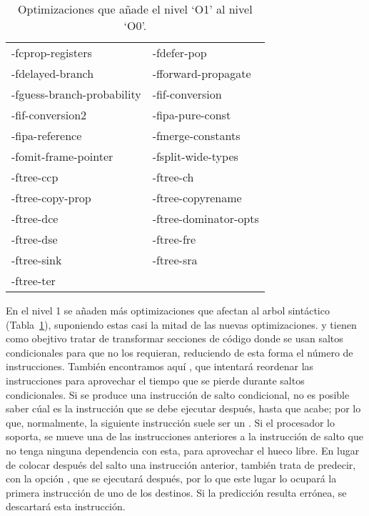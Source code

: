 \begin{table}[htb]
\begin{center}
	\begin{tabular}{|ll|}
		\hline
		-fcprop-registers & -fdefer-pop\\
		-fdelayed-branch & -fforward-propagate\\
		-fguess-branch-probability &-fif-conversion\\
		-fif-conversion2 & -fipa-pure-const\\
		-fipa-reference & -fmerge-constants\\
		-fomit-frame-pointer & -fsplit-wide-types\\
		-ftree-ccp & -ftree-ch\\
		-ftree-copy-prop & -ftree-copyrename\\
		-ftree-dce & -ftree-dominator-opts\\
		-ftree-dse & -ftree-fre\\
		-ftree-sink & -ftree-sra\\
		-ftree-ter & \\
		\hline
	\end{tabular}
\end{center}
\caption{Optimizaciones que añade el nivel `O1' al nivel `O0'.}
\label{opt1}
\end{table}

En el nivel 1 se añaden más optimizaciones que afectan al arbol sintáctico (Tabla~\ref{opt1}), suponiendo estas casi la mitad de las nuevas optimizaciones.  y  tienen como obejtivo tratar de transformar secciones de código donde se usan saltos condicionales para que no los requieran, reduciendo de esta forma el número de instrucciones. También encontramos aquí , que intentará reordenar las instrucciones para aprovechar el tiempo que se pierde durante saltos condicionales. Si se produce una instrucción de salto condicional, no es posible saber cúal es la instrucción que se debe ejecutar después, hasta que acabe; por lo que, normalmente, la siguiente instrucción suele ser un . Si el procesador lo soporta, se mueve una de las instrucciones anteriores a la instrucción de salto que no tenga ninguna dependencia con esta, para aprovechar el hueco libre. En lugar de colocar después del salto una instrucción anterior,  también trata de predecir, con la opción , que se ejecutará después, por lo que este lugar lo ocupará la primera instrucción de uno de los destinos. Si la predicción resulta errónea, se descartará esta instrucción.

